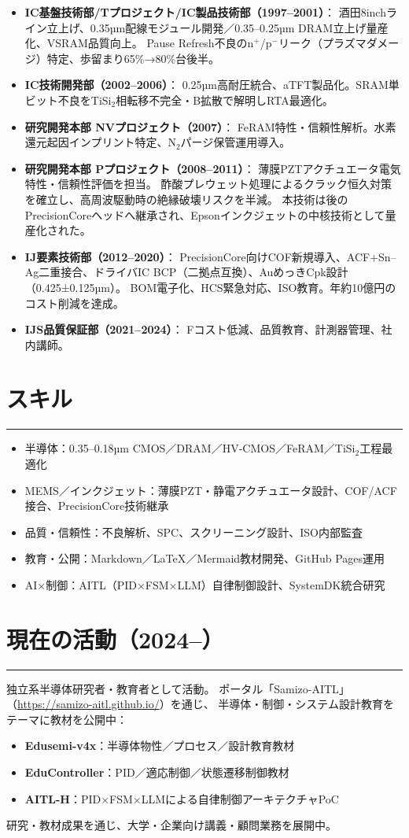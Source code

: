 \documentclass[lualatex,ja=standard,11pt]{bxjsarticle}
\newcommand{\cvsection}[1]{\section*{#1}\vspace{-0.3em}\hrule\vspace{0.5em}}
\begin{document}
\begin{itemize}
  \item \textbf{IC基盤技術部/Tプロジェクト/IC製品技術部（1997–2001）}：
  酒田8inchライン立上げ、0.35µm配線モジュール開発／0.35–0.25µm DRAM立上げ量産化、VSRAM品質向上。
  Pause Refresh不良のn$^+$/p$^-$リーク（プラズマダメージ）特定、歩留まり65\%→80\%台後半。

  \item \textbf{IC技術開発部（2002–2006）}：
  0.25µm高耐圧統合、aTFT製品化。SRAM単ビット不良をTiSi$_2$相転移不完全・B拡散で解明しRTA最適化。

  \item \textbf{研究開発本部 NVプロジェクト（2007）}：
  FeRAM特性・信頼性解析。水素還元起因インプリント特定、N$_2$パージ保管運用導入。

  \item \textbf{研究開発本部 Pプロジェクト（2008–2011）}：
  薄膜PZTアクチュエータ電気特性・信頼性評価を担当。
  酢酸プレウェット処理によるクラック恒久対策を確立し、高周波駆動時の絶縁破壊リスクを半減。
  本技術は後のPrecisionCoreヘッドへ継承され、Epsonインクジェットの中核技術として量産化された。

  \item \textbf{IJ要素技術部（2012–2020）}：
  PrecisionCore向けCOF新規導入、ACF+Sn–Ag二重接合、ドライバIC BCP（二拠点互換）、AuめっきCpk設計（0.425±0.125µm）。
  BOM電子化、HCS緊急対応、ISO教育。年約10億円のコスト削減を達成。

  \item \textbf{IJS品質保証部（2021–2024）}：
  Fコスト低減、品質教育、計測器管理、社内講師。
\end{itemize}

\cvsection{スキル}
\begin{itemize}
  \item 半導体：0.35–0.18µm CMOS／DRAM／HV-CMOS／FeRAM／TiSi$_2$工程最適化
  \item MEMS／インクジェット：薄膜PZT・静電アクチュエータ設計、COF/ACF接合、PrecisionCore技術継承
  \item 品質・信頼性：不良解析、SPC、スクリーニング設計、ISO内部監査
  \item 教育・公開：Markdown／LaTeX／Mermaid教材開発、GitHub Pages運用
  \item AI×制御：AITL（PID×FSM×LLM）自律制御設計、SystemDK統合研究
\end{itemize}

\cvsection{現在の活動（2024–）}
独立系半導体研究者・教育者として活動。  
ポータル「Samizo-AITL」（\href{https://samizo-aitl.github.io/}{https://samizo-aitl.github.io/}）を通じ、  
半導体・制御・システム設計教育をテーマに教材を公開中：  
\begin{itemize}
  \item \textbf{Edusemi-v4x}：半導体物性／プロセス／設計教育教材
  \item \textbf{EduController}：PID／適応制御／状態遷移制御教材
  \item \textbf{AITL-H}：PID×FSM×LLMによる自律制御アーキテクチャPoC
\end{itemize}
研究・教材成果を通じ、大学・企業向け講義・顧問業務を展開中。
\end{document}
